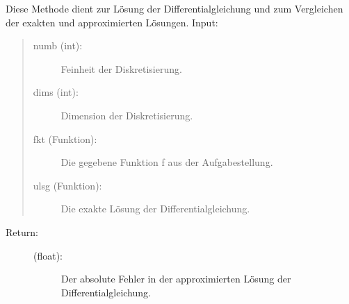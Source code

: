 \documentclass[letterpaper,10pt,ngerman]{sphinxmanual}
\begin{document}
\begin{fulllineitems}
\label{\detokenize{index:aufg_3_2u3_main.loesg}}
Diese Methode dient zur Lösung der Differentialgleichung und zum Vergleichen der exakten
und approximierten Lösungen.
Input:
\begin{quote}
\begin{description}
\item[{numb (int):}] \leavevmode
Feinheit der Diskretisierung.

\item[{dims (int):}] \leavevmode
Dimension der Diskretisierung.

\item[{fkt (Funktion):}] \leavevmode
Die gegebene Funktion f aus der Aufgabestellung.

\item[{ulsg (Funktion):}] \leavevmode
Die exakte Lösung der Differentialgleichung.

\end{description}
\end{quote}
\begin{description}
\item[{Return:}] \leavevmode\begin{description}
\item[{(float):}] \leavevmode
Der absolute Fehler in der approximierten Lösung der Differentialgleichung.

\end{description}

\end{description}

\end{fulllineitems}

\end{document}
